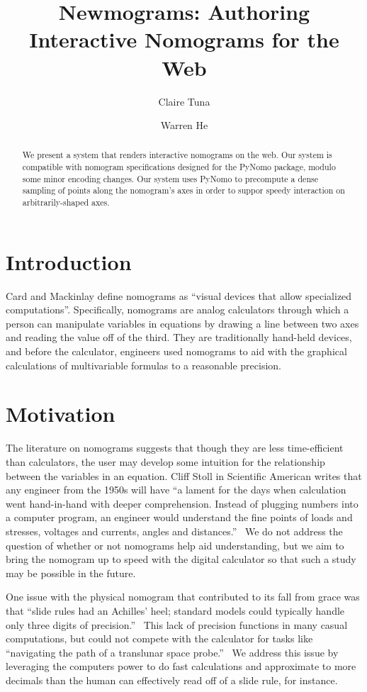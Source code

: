 \documentclass{proc}
\title{Newmograms: Authoring Interactive Nomograms for the Web}
\author{Claire Tuna \and Warren He}
\begin{document}
\maketitle

\begin{abstract}
We present a system that renders interactive nomograms on the web.
Our system is compatible with nomogram specifications designed for the
PyNomo package, modulo some minor encoding changes.
Our system uses PyNomo to precompute a dense sampling of points along
the nomogram's axes in order to suppor speedy interaction on
arbitrarily-shaped axes.
\end{abstract}

\section{Introduction}
Card and Mackinlay define nomograms as ``visual devices that allow
specialized computations''. Specifically, nomograms are analog
calculators through which a person can manipulate variables in
equations by drawing a line between two axes and reading the value off
of the third. They are traditionally hand-held devices, and before the
calculator, engineers used nomograms to aid with the graphical
calculations of multivariable formulas to a reasonable precision.

\section{Motivation}
The literature on nomograms suggests that though they are less
time-efficient than calculators, the user may develop some intuition
for the relationship between the variables in an equation. Cliff Stoll
in Scientific American writes that any engineer from the 1950s will
have ``a lament for the days when calculation went hand-in-hand with
deeper comprehension. Instead of plugging numbers into a computer
program, an engineer would understand the fine points of loads and
stresses, voltages and currents, angles and distances.''~\cite{sci-am}
We do not address the question of whether or not nomograms help aid
understanding, but we aim to bring the nomogram up to speed with the
digital calculator so that such a study may be possible in the future.

One issue with the physical nomogram that contributed to its fall from
grace was that ``slide rules had an Achilles' heel; standard models
could typically handle only three digits of precision.''~\cite{sci-am}
This lack of precision functions in many casual computations, but
could not compete with the calculator for tasks like “navigating the
path of a translunar space probe.''~\cite{sci-am} We address this
issue by leveraging the computers power to do fast calculations and
approximate to more decimals than the human can effectively read off
of a slide rule, for instance.
\end{document}
